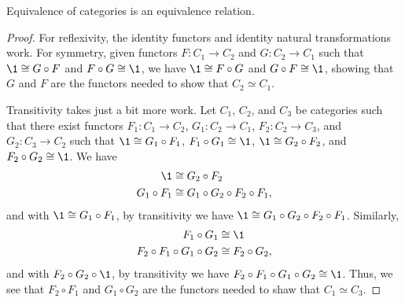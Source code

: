 \documentclass[../../math.tex]{subfiles}
\begin{document}
\begin{theorem}
    Equivalence of categories is an equivalence relation.
\end{theorem}
\begin{proof}
    For reflexivity, the identity functors and identity natural transformations
    work.  For symmetry, given functors $F : C_1 \to C_2$ and $G : C_2 \to C_1$
    such that $\1 \cong G \circ F$ and $F \circ G \cong \1$, we have $\1 \cong F
    \circ G$ and $G \circ F \cong \1$, showing that $G$ and $F$ are the functors
    needed to show that $C_2 \simeq C_1$.

    Transitivity takes just a bit more work.  Let $C_1$, $C_2$, and $C_3$ be
    categories such that there exist functors $F_1 : C_1 \to C_2$, $G_1 : C_2
    \to C_1$, $F_2 : C_2 \to C_3$, and $G_2 : C_3 \to C_2$ such that $\1 \cong
    G_1 \circ F_1$, $F_1 \circ G_1 \cong \1$, $\1 \cong G_2 \circ F_2$, and $F_2
    \circ G_2 \cong \1$.  We have
    \begin{align*}
        \1 &\cong G_2 \circ F_2 \\
        G_1 \circ F_1 &\cong G_1 \circ G_2 \circ F_2 \circ F_1,
    \end{align*}
    and with $\1 \cong G_1 \circ F_1$, by transitivity we have $\1 \cong G_1
    \circ G_2 \circ F_2 \circ F_1$.  Similarly,
    \begin{align*}
        F_1 \circ G_1 &\cong \1 \\
        F_2 \circ F_1 \circ G_1 \circ G_2 &\cong F_2 \circ G_2,
    \end{align*}
    and with $F_2 \circ G_2 \circ \1$, by transitivity we have $F_2
    \circ F_1 \circ G_1 \circ G_2 \cong \1$.  Thus, we see that $F_2 \circ F_1$
    and $G_1 \circ G_2$ are the functors needed to shaw that $C_1 \simeq C_3$.
\end{proof}
\end{document}
